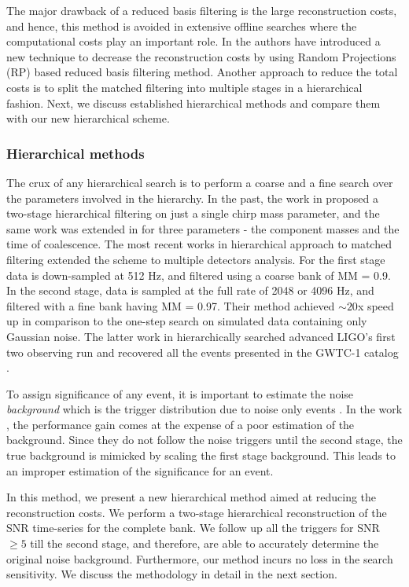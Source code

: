 The major drawback of a reduced basis filtering is the large reconstruction costs, and hence, this method is avoided in extensive offline searches where the computational costs play an important role. In \cite{RP-1, RP-2} the authors have introduced a new technique to decrease the reconstruction costs by using Random Projections (RP) based reduced basis filtering method. Another approach to reduce the total costs is to split the matched filtering into multiple stages in a hierarchical fashion. Next, we discuss established hierarchical methods and compare them with our new hierarchical scheme.

\subsubsection{Hierarchical methods}

The crux of any hierarchical search is to perform a coarse and a fine search over the parameters involved in the hierarchy. In the past, the work in \cite{hierarchy_mass} proposed a two-stage hierarchical filtering on just a single chirp mass parameter, and the same work was extended in \cite{hierarchy_tau0} for three parameters - the component masses and the time of coalescence. The most recent works \cite{bhooshan, kanchan} in hierarchical approach to matched filtering extended the scheme to multiple detectors analysis. For the first stage data is down-sampled at 512 Hz, and filtered using a coarse bank of MM = 0.9. In the second stage, data is sampled at the full rate of 2048 or 4096 Hz, and filtered with a fine bank having MM = 0.97. Their method achieved $\sim 20$x speed up in comparison to the one-step search on simulated data containing only Gaussian noise. The latter work in \cite{kanchan} hierarchically searched advanced LIGO's first two observing run and recovered all the events presented in the GWTC-1 catalog \cite{GWTC1}.

To assign significance of any event, it is important to estimate the noise \textit{background} which is the trigger distribution due to noise only events \cite{Usman_pycbc}. In the work \cite{bhooshan, kanchan}, the performance gain comes at the expense of a poor estimation of the background. Since they do not follow the noise triggers until the second stage, the true background is mimicked by scaling the first stage background. This leads to an improper estimation of the significance for an event.

In this method, we present a new hierarchical method aimed at reducing the reconstruction costs. We perform a two-stage hierarchical reconstruction of the SNR time-series for the complete bank. We follow up all the triggers for SNR $\geq 5$ till the second stage, and therefore, are able to accurately determine the original noise background. Furthermore, our method incurs no loss in the search sensitivity. We discuss the methodology in detail in the next section.   
 


